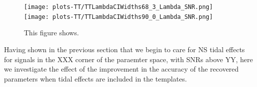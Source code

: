 \documentclass[aps,prd,amsmath,floats,floatfix, twocolumn,
superscriptaddress,nofootinbib,showpacs]{revtex4-1}
\begin{document}
% 
\begin{figure}
\centering    
\texttt{[image: plots-TT/TTLambdaCIWidths68\_3\_Lambda\_SNR.png]}\\
\texttt{[image: plots-TT/TTLambdaCIWidths90\_0\_Lambda\_SNR.png]}
\caption{This figure shows.}
\label{fig:TT_LambdaCIWidths90_0_Lambda_SNR}
\end{figure}
% 

Having shown in the previous section that we begin to care for NS tidal effects
for signals in the XXX corner of the paraemter space, with SNRs above YY, here
we investigate the effect of the improvement in the accuracy of the recovered
parameters when tidal effects are included in the templates.
\end{document}
